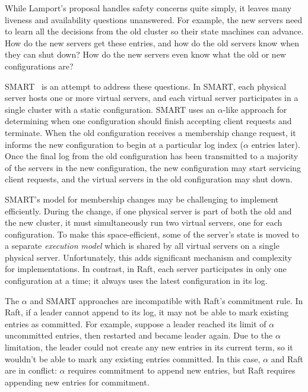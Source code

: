 While Lamport's proposal handles safety concerns quite simply, it leaves
many liveness and availability questions unanswered. For example, the
new servers need to learn all the decisions from the old cluster so
their state machines can advance. How do the new servers get these
entries, and how do the old servers know when they can shut down? How do
the new servers even know what the old or new configurations are?


SMART~\cite{Lorch:2006} is an attempt to address these questions. In
SMART, each physical server hosts one or more virtual servers, and each
virtual server participates in a single cluster with a static
configuration. SMART uses an $\alpha$-like approach for determining when
one configuration should finish accepting client requests and terminate.
When the old configuration receives a membership change request, it
informs the new configuration to begin at a particular log index
($\alpha$ entries later). Once the final log from the old configuration
has been transmitted to a majority of the servers in the new
configuration, the new configuration may start servicing client
requests, and the virtual servers in the old configuration may shut
down.


SMART's model for membership changes may be challenging to implement
efficiently. During the change, if one physical server is part of both
the old and the new cluster, it must simultaneously run two virtual
servers, one for each configuration. To make this space-efficient, some
of the server's state is moved to a separate \emph{execution model}
which is shared by all virtual servers on a single physical server.
Unfortunately, this
adds significant mechanism and complexity for implementations. In
contrast, in Raft, each server participates in only one configuration at
a time; it always uses the latest configuration in its log.

The $\alpha$ and SMART approaches are incompatible with Raft's
commitment rule. In Raft, if a leader cannot append to its log, it may
not be able to mark existing entries as committed. For example, suppose
a leader reached its limit of $\alpha$ uncommitted entries, then
restarted and became leader again. Due to the $\alpha$ limitation, the
leader could not create any new entries in its current term, so it
wouldn't be able to mark any existing entries committed. In this case,
$\alpha$ and Raft are in conflict: $\alpha$ requires commitment to
append new entries, but Raft requires appending new entries for
commitment.

